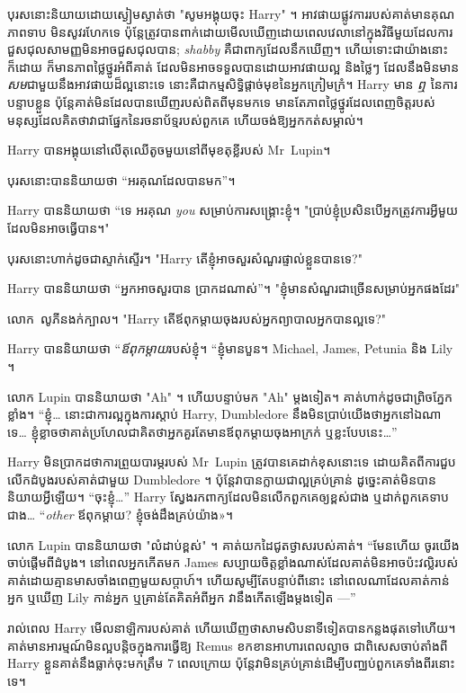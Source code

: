 បុរសនោះនិយាយដោយស្ងៀមស្ងាត់ថា "សូមអង្គុយចុះ Harry" ។ អាវផាយផ្លូវការរបស់គាត់មានគុណភាពទាប មិនសូវរហែកទេ ប៉ុន្តែត្រូវបានពាក់ដោយមើលឃើញដោយពេលវេលានៅក្នុងវិធីមួយដែលការជួសជុលសាមញ្ញមិនអាចជួសជុលបាន; \emph{shabby} គឺជាពាក្យដែលនឹកឃើញ។ ហើយទោះជាយ៉ាងនោះក៏ដោយ ក៏មានភាពថ្លៃថ្នូរអំពីគាត់ ដែលមិនអាចទទួលបានដោយអាវផាយល្អ និងថ្លៃៗ ដែលនឹងមិនមាន\emph{សម}ជាមួយនឹងអាវផាយដ៏ល្អនោះទេ នោះគឺជាកម្មសិទ្ធិផ្តាច់មុខនៃអ្នកក្រៀមក្រំ។ Harry មាន \emph{ឮ} នៃការបន្ទាបខ្លួន ប៉ុន្តែគាត់មិនដែលបានឃើញរបស់ពិតពីមុនមកទេ មានតែភាពថ្លៃថ្នូរដែលពេញចិត្តរបស់មនុស្សដែលគិតថាវាជាផ្នែកនៃរចនាប័ទ្មរបស់ពួកគេ ហើយចង់ឱ្យអ្នកកត់សម្គាល់។

Harry បានអង្គុយនៅលើតុឈើតូចមួយនៅពីមុខតុខ្លីរបស់ Mr~Lupin។

បុរស​នោះ​បាន​និយាយ​ថា “អរគុណ​ដែល​បាន​មក”។

Harry បាននិយាយថា “ទេ អរគុណ \emph{you} សម្រាប់ការសង្គ្រោះខ្ញុំ។ "ប្រាប់ខ្ញុំប្រសិនបើអ្នកត្រូវការអ្វីមួយដែលមិនអាចធ្វើបាន។"

បុរសនោះហាក់ដូចជាស្ទាក់ស្ទើរ។ "Harry តើខ្ញុំអាចសួរសំណួរផ្ទាល់ខ្លួនបានទេ?"

Harry បាននិយាយថា “អ្នកអាចសួរបាន ប្រាកដណាស់”។ "ខ្ញុំមានសំណួរជាច្រើនសម្រាប់អ្នកផងដែរ"

លោក~លូភីនងក់ក្បាល។ "Harry តើឪពុកម្តាយចុងរបស់អ្នកព្យាបាលអ្នកបានល្អទេ?"

Harry បាននិយាយថា “\emph{ឪពុកម្តាយ}របស់ខ្ញុំ។ “ខ្ញុំមានបួន។ Michael, James, Petunia និង Lily ។

លោក Lupin បាននិយាយថា "Ah" ។ ហើយបន្ទាប់មក "Ah" ម្តងទៀត។ គាត់ហាក់ដូចជាព្រិចភ្នែកខ្លាំង។ “ខ្ញុំ… នោះជាការល្អក្នុងការស្តាប់ Harry, Dumbledore នឹងមិនប្រាប់យើងថាអ្នកនៅឯណាទេ… ខ្ញុំខ្លាចថាគាត់ប្រហែលជាគិតថាអ្នកគួរតែមានឪពុកម្តាយចុងអាក្រក់ ឬខ្លះបែបនេះ…”

Harry មិនប្រាកដថាការព្រួយបារម្ភរបស់ Mr~Lupin ត្រូវបានគេដាក់ខុសនោះទេ ដោយគិតពីការជួបលើកដំបូងរបស់គាត់ជាមួយ Dumbledore ។ ប៉ុន្តែ​វា​បាន​ក្លាយ​ជា​ល្អ​គ្រប់​គ្រាន់ ដូច្នេះ​គាត់​មិន​បាន​និយាយ​អ្វី​ឡើយ។ “ចុះខ្ញុំ…” Harry ស្វែងរកពាក្យដែលមិនលើកពួកគេឲ្យខ្ពស់ជាង ឬដាក់ពួកគេទាបជាង… “\emph{other} ឪពុកម្តាយ? ខ្ញុំ​ចង់​ដឹង​គ្រប់​យ៉ាង»។

លោក Lupin បាននិយាយថា "លំដាប់ខ្ពស់" ។ គាត់​យក​ដៃ​ជូត​ថ្ងាស​របស់​គាត់។ “មែនហើយ ចូរយើងចាប់ផ្តើមពីដំបូង។ នៅ​ពេល​អ្នក​កើត​មក James សប្បាយ​ចិត្ត​ខ្លាំង​ណាស់​ដែល​គាត់​មិន​អាច​ប៉ះ​វល្លិ​របស់​គាត់​ដោយ​គ្មាន​មាស​ចាំង​ពេញ​មួយ​សប្តាហ៍។ ហើយសូម្បីតែបន្ទាប់ពីនោះ នៅពេលណាដែលគាត់កាន់អ្នក ឬឃើញ Lily កាន់អ្នក ឬគ្រាន់តែគិតអំពីអ្នក វានឹងកើតឡើងម្តងទៀត —”

\later

រាល់ពេល Harry មើលនាឡិការបស់គាត់ ហើយឃើញថាសាមសិបនាទីទៀតបានកន្លងផុតទៅហើយ។ គាត់មានអារម្មណ៍មិនល្អបន្តិចក្នុងការធ្វើឱ្យ Remus ខកខានអាហារពេលល្ងាច ជាពិសេសចាប់តាំងពី Harry ខ្លួនគាត់នឹងធ្លាក់ចុះមកត្រឹម 7ៅពេលក្រោយ ប៉ុន្តែវាមិនគ្រប់គ្រាន់ដើម្បីបញ្ឈប់ពួកគេទាំងពីរនោះទេ។

